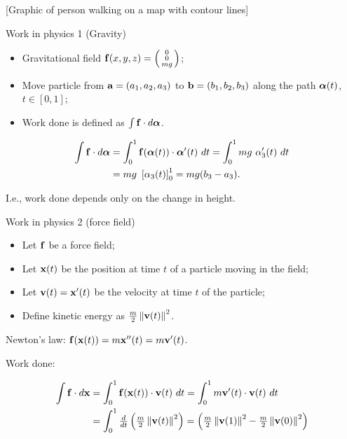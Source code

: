 [Graphic of person walking on a map with contour lines]





{Work in physics 1 (Gravity)}


\begin{itemize}
    \item Gravitational field \(\ff(x,y,z) = \left(\begin{smallmatrix}
              0 \\ 0 \\ mg
          \end{smallmatrix}\right)\);
    \item Move particle from \(\aa=(a_1,a_2,a_3)\) to \(\bb=(b_1,b_2,b_3)\) along the path \(\aalpha(t)\), \(t\in [0,1]\);
    \item Work done is defined as \(\int \ff \cdot d\aalpha\).
\end{itemize}

\[
    \begin{aligned}
        \int \ff \cdot d\aalpha & = \int_0^1 \ff(\aalpha(t)) \cdot \aalpha'(t) \ dt
        = \int_0^1 mg \ \alpha_3'(t) \ dt                                               \\
                                & = mg \ \left[ \alpha_3(t)\right]_0^1 = mg(b_3 - a_3).
    \end{aligned}
\]

{I.e.,} work done depends only on the change in height.




    {Work in physics 2 (force field)}

\begin{itemize}
    \item Let \(\ff\) be a force field;
    \item Let \(\xx(t)\) be the position at time \(t\) of a particle moving in the field;
    \item Let \(\vv(t) = \xx'(t)\) be the velocity at time \(t\) of the particle;
    \item Define kinetic energy as \(\frac{m}{2} \norm{\vv(t)}^2\).
\end{itemize}

{Newton's law:}
\(\ff(\xx(t)) = m\xx''(t) = m \vv'(t)\).

    {Work done:}

\[
    \begin{aligned}
        \int \ff \cdot d\xx
         & = \int_0^1 \ff(\xx(t)) \cdot \vv(t) \ dt
        = \int_0^1 m\vv'(t) \cdot \vv(t) \ dt                                   \\
         & = \int_0^1 \tfrac{d}{dt} \left( \tfrac{m}{2} \norm{\vv(t)}^2 \right)
        = \left(  \tfrac{m}{2} \norm{\vv(1)}^2  -  \tfrac{m}{2} \norm{\vv(0)}^2   \right)
    \end{aligned}
\]

